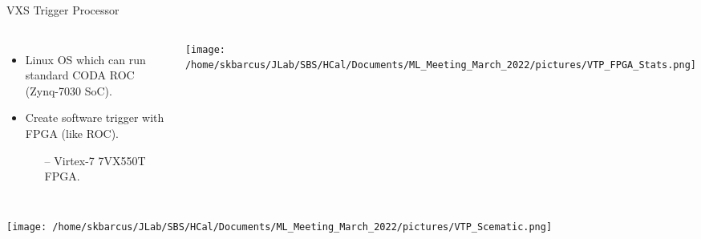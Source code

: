 \documentclass[10pt]{beamer}
\begin{document}
\begin{frame}{VXS Trigger Processor}

    \begin{columns}[T,onlytextwidth]
	\begin{itemize}
		\item Linux OS which can run standard CODA ROC (Zynq-7030 SoC).
		\item \alert{Create software trigger with FPGA (like ROC).}
			\begin{itemize}
				\item[--] Virtex-7 7VX550T FPGA.
			\end{itemize}
	\end{itemize}

	
  	\centerline{\texttt{[image: /home/skbarcus/JLab/SBS/HCal/Documents/ML\_Meeting\_March\_2022/pictures/VTP\_FPGA\_Stats.png]}}
  	
  	\end{columns}
  	
  	\centerline{\texttt{[image: /home/skbarcus/JLab/SBS/HCal/Documents/ML\_Meeting\_March\_2022/pictures/VTP\_Scematic.png]}}

\end{frame}
\end{document}
